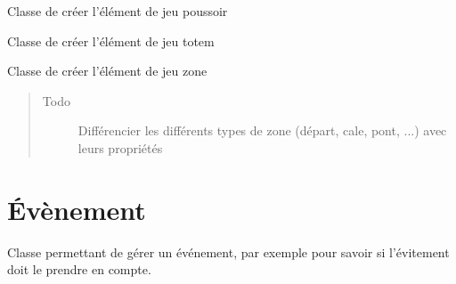 \documentclass[letterpaper,10pt,french]{sphinxmanual}
\begin{document}
\begin{fulllineitems}
\label{elements_jeu:lib.elements_jeu.Poussoir}
Classe de créer l'élément de jeu poussoir

\end{fulllineitems}


\begin{fulllineitems}
\label{elements_jeu:lib.elements_jeu.Totem}
Classe de créer l'élément de jeu totem

\end{fulllineitems}


\begin{fulllineitems}
\label{elements_jeu:lib.elements_jeu.Zone}
Classe de créer l'élément de jeu zone
\begin{quote}\begin{description}
\item[{Todo }] \leavevmode
Différencier les différents types de zone (départ, cale, pont, ...) avec leurs propriétés

\end{description}\end{quote}

\end{fulllineitems}



\chapter{Évènement}
\label{evenement:evenement}\label{evenement:module-lib.evenement}\label{evenement::doc}

\begin{fulllineitems}
\label{evenement:lib.evenement.Evenement}
Classe permettant de gérer un événement, par exemple pour savoir si l'évitement doit le prendre en compte.

\end{fulllineitems}
\end{document}
